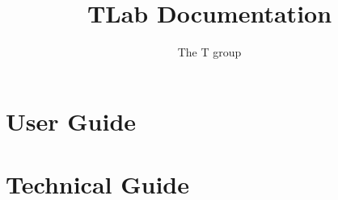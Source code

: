 \documentclass[a4paper,11pt]{book}
\title{{\bf T}\textcolor{black!50}{Lab} Documentation}
\author{The T group}
\begin{document}
\frontmatter
\pagestyle{empty}
\maketitle
\tableofcontents

\setlength{\parskip}{0.5\baselineskip}


\mainmatter
\pagestyle{fancy}

\part{User Guide}






\part{Technical Guide}





\backmatter


\end{document}
